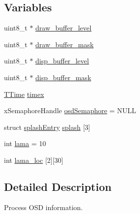 \subsection*{\-Variables}
\begin{DoxyCompactItemize}
\item 
uint8\-\_\-t $\ast$ \hyperlink{group___o_s_d_g_e_n_module_ga52b5c0fc86a398ddf62c5b2bb383374d}{draw\-\_\-buffer\-\_\-level}
\item 
uint8\-\_\-t $\ast$ \hyperlink{group___o_s_d_g_e_n_module_ga67085db0125b910109083e4d2605d7d5}{draw\-\_\-buffer\-\_\-mask}
\item 
uint8\-\_\-t $\ast$ \hyperlink{group___o_s_d_g_e_n_module_gac6ace302511130c48032b40f32a40bb8}{disp\-\_\-buffer\-\_\-level}
\item 
uint8\-\_\-t $\ast$ \hyperlink{group___o_s_d_g_e_n_module_ga2de64a6d3102b302a9b7582d63f09485}{disp\-\_\-buffer\-\_\-mask}
\item 
\hyperlink{struct_t_time}{\-T\-Time} \hyperlink{group___o_s_d_g_e_n_module_gac6e460448d29f05aad59dc67c3035057}{timex}
\item 
x\-Semaphore\-Handle \hyperlink{group___o_s_d_g_e_n_module_ga34f96a89a1ad6c4649787dbc18e218e5}{osd\-Semaphore} = \-N\-U\-L\-L
\item 
struct \hyperlink{structsplash_entry}{splash\-Entry} \hyperlink{group___o_s_d_g_e_n_module_gafd73dea95bd8cae01a8225936c4c302e}{splash} \mbox{[}3\mbox{]}
\item 
int \hyperlink{group___o_s_d_g_e_n_module_ga36bea199c0657c29a6c7836f8157066e}{lama} = 10
\item 
int \hyperlink{group___o_s_d_g_e_n_module_ga35258f3e002e3b7d6dc3a50b458c1ed5}{lama\-\_\-loc} \mbox{[}2\mbox{]}\mbox{[}30\mbox{]}
\end{DoxyCompactItemize}


\subsection{\-Detailed \-Description}
\-Process \-O\-S\-D information. 

